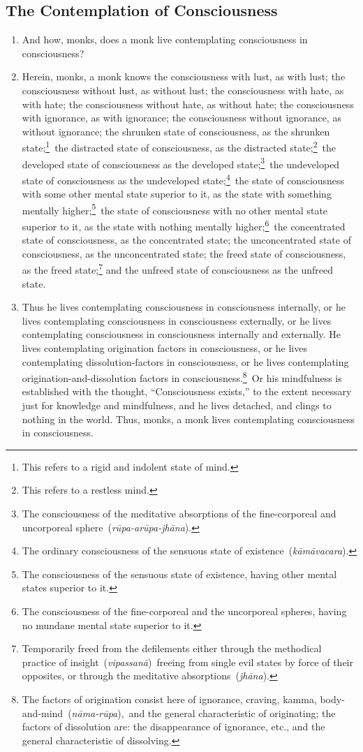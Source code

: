 \subsection*{The Contemplation of Consciousness}
\begin{enumerate}[resume]
\item And how, monks, does a monk live contemplating consciousness in consciousness?
\item Herein, monks, a monk knows the consciousness with lust, as with lust; the consciousness without lust, as without lust; the consciousness with hate, as with hate; the consciousness without hate, as without hate; the consciousness with ignorance, as with ignorance; the consciousness without ignorance, as without ignorance; the shrunken state of consciousness, as the shrunken state;\footnote{This refers to a rigid and indolent state of mind.} the distracted state of consciousness, as the distracted state;\footnote{This refers to a restless mind.} the developed state of consciousness as the developed state;\footnote{The consciousness of the meditative absorptions of the fine-corporeal and uncorporeal sphere (\textit{rūpa-arūpa-jhāna}).} the undeveloped state of consciousness as the undeveloped state;\footnote{The ordinary consciousness of the sensuous state of existence (\textit{kāmāvacara}).} the state of consciousness with some other mental state superior to it, as the state with something mentally higher;\footnote{The consciousness of the sensuous state of existence, having other mental states superior to it.} the state of consciousness with no other mental state superior to it, as the state with nothing mentally higher;\footnote{The consciousness of the fine-corporeal and the uncorporeal spheres, having no mundane mental state superior to it.} the concentrated state of consciousness, as the concentrated state; the unconcentrated state of consciousness, as the unconcentrated state; the freed state of consciousness, as the freed state;\footnote{Temporarily freed from the defilements either through the methodical practice of insight (\textit{vipassanā}) freeing from single evil states by force of their opposites, or through the meditative absorptions (\textit{jhāna}).} and the unfreed state of consciousness as the unfreed state.
\item Thus he lives contemplating consciousness in consciousness internally, or he lives contemplating consciousness in consciousness externally, or he lives contemplating  consciousness in consciousness internally and externally. He lives contemplating origination factors in consciousness, or he lives contemplating dissolution-factors in consciousness, or he lives contemplating origination-and-dissolution factors in consciousness.\footnote{The factors of origination consist here of ignorance, craving, kamma, body-and-mind (\textit{nāma-rūpa}), and the general characteristic of originating; the factors of dissolution are: the disappearance of ignorance, etc., and the general characteristic of dissolving.} Or his mindfulness is established with the thought, “Consciousness exists,” to the extent necessary just for knowledge and mindfulness, and he lives detached, and clings to nothing in the world. Thus, monks, a monk lives contemplating consciousness in consciousness.
\end{enumerate}

